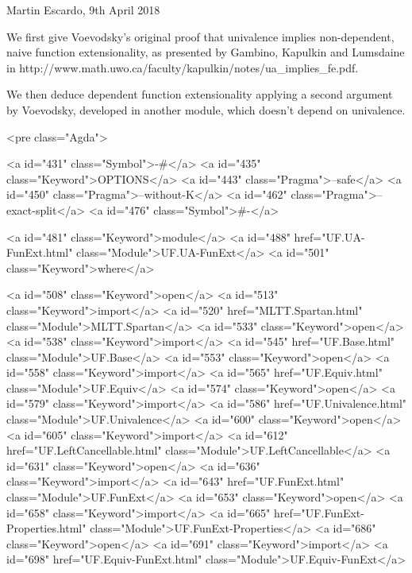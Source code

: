 Martin Escardo, 9th April 2018

We first give Voevodsky's original proof that univalence implies
non-dependent, naive function extensionality, as presented by Gambino,
Kapulkin and Lumsdaine in
http://www.math.uwo.ca/faculty/kapulkin/notes/ua_implies_fe.pdf.

We then deduce dependent function extensionality applying a second
argument by Voevodsky, developed in another module, which doesn't
depend on univalence.

<pre class="Agda">

<a id="431" class="Symbol">{-#</a> <a id="435" class="Keyword">OPTIONS</a> <a id="443" class="Pragma">--safe</a> <a id="450" class="Pragma">--without-K</a> <a id="462" class="Pragma">--exact-split</a> <a id="476" class="Symbol">#-}</a>

<a id="481" class="Keyword">module</a> <a id="488" href="UF.UA-FunExt.html" class="Module">UF.UA-FunExt</a> <a id="501" class="Keyword">where</a>

<a id="508" class="Keyword">open</a> <a id="513" class="Keyword">import</a> <a id="520" href="MLTT.Spartan.html" class="Module">MLTT.Spartan</a>
<a id="533" class="Keyword">open</a> <a id="538" class="Keyword">import</a> <a id="545" href="UF.Base.html" class="Module">UF.Base</a>
<a id="553" class="Keyword">open</a> <a id="558" class="Keyword">import</a> <a id="565" href="UF.Equiv.html" class="Module">UF.Equiv</a>
<a id="574" class="Keyword">open</a> <a id="579" class="Keyword">import</a> <a id="586" href="UF.Univalence.html" class="Module">UF.Univalence</a>
<a id="600" class="Keyword">open</a> <a id="605" class="Keyword">import</a> <a id="612" href="UF.LeftCancellable.html" class="Module">UF.LeftCancellable</a>
<a id="631" class="Keyword">open</a> <a id="636" class="Keyword">import</a> <a id="643" href="UF.FunExt.html" class="Module">UF.FunExt</a>
<a id="653" class="Keyword">open</a> <a id="658" class="Keyword">import</a> <a id="665" href="UF.FunExt-Properties.html" class="Module">UF.FunExt-Properties</a>
<a id="686" class="Keyword">open</a> <a id="691" class="Keyword">import</a> <a id="698" href="UF.Equiv-FunExt.html" class="Module">UF.Equiv-FunExt</a>

